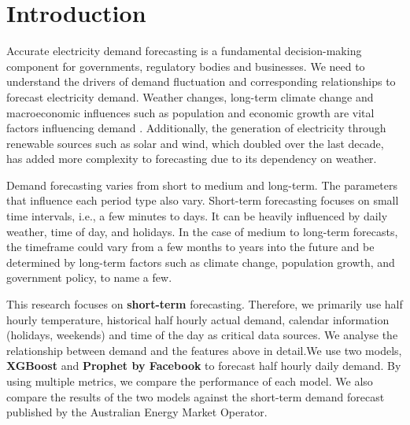 \documentclass[mstat,12pt]{unswthesis}
\begin{document}


\afterpreface





%
%






\chapter{Introduction}\label{introduction}

Accurate electricity demand forecasting is a fundamental decision-making
component for governments, regulatory bodies and businesses. We need to
understand the drivers of demand fluctuation and corresponding
relationships to forecast electricity demand. Weather changes, long-term
climate change and macroeconomic influences such as population and
economic growth are vital factors influencing demand \cite{a2024_nem}.
Additionally, the generation of electricity through renewable sources
such as solar and wind, which doubled over the last decade, has added
more complexity to forecasting due to its dependency on
weather.

Demand forecasting varies from short to medium and long-term. The
parameters that influence each period type also vary. Short-term
forecasting focuses on small time intervals, i.e., a few minutes to
days. It can be heavily influenced by daily weather, time of day, and
holidays. In the case of medium to long-term forecasts, the timeframe
could vary from a few months to years into the future and be determined
by long-term factors such as climate change, population growth, and
government policy, to name a few.

This research focuses on \textbf{short-term} forecasting. Therefore, we
primarily use half hourly temperature, historical half hourly actual
demand, calendar information (holidays, weekends) and time of the day as
critical data sources. We analyse the relationship between demand and
the features above in detail.We use two models, \textbf{XGBoost} and
\textbf{Prophet by Facebook} to forecast half hourly daily demand. By
using multiple metrics, we compare the performance of each model. We
also compare the results of the two models against the short-term demand
forecast published by the Australian Energy Market Operator.
\end{document}

